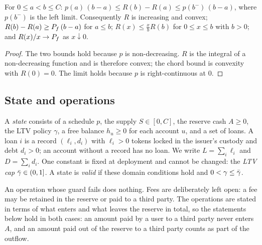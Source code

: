 \begin{lemma}\label{lem:R}
For $0\le a<b\le C$: $p(a)\,(b-a)\le R(b)-R(a)\le p(b^-)\,(b-a)$, where $p(b^-)$ is the left limit. Consequently $R$ is increasing and convex; $R(b)-R(a)\ge P_f\,(b-a)$ for $a\le b$; $R(x)\le \tfrac{x}{b}R(b)$ for $0\le x\le b$ with $b>0$; and $R(x)/x\to P_f$ as $x\downarrow0$.
\end{lemma}
\begin{proof}
The two bounds hold because $p$ is non-decreasing. $R$ is the integral of a non-decreasing function and is therefore convex; the chord bound is convexity with $R(0)=0$. The limit holds because $p$ is right-continuous at $0$.
\end{proof}

\subsection{State and operations}

A \emph{state} consists of a schedule $p$, the supply $S\in[0,C]$, the reserve cash $A\ge 0$, the LTV policy $\gamma$, a free balance $h_u\ge0$ for each account $u$, and a set of loans. A loan $i$ is a record $(\ell_i,d_i)$ with $\ell_i>0$ tokens locked in the issuer's custody and debt $d_i>0$; an account without a record has no loan. We write $L=\sum_i\ell_i$ and $D=\sum_i d_i$. One constant is fixed at deployment and cannot be changed: the \emph{LTV cap} $\bar\gamma\in(0,1]$. A state is \emph{valid} if these domain conditions hold and $0<\gamma\le\bar\gamma$.

An operation whose guard fails does nothing. Fees are deliberately left open: a fee may be retained in the reserve or paid to a third party. The operations are stated in terms of what enters and what leaves the reserve in total, so the statements below hold in both cases: an amount paid by a user to a third party never enters $A$, and an amount paid out of the reserve to a third party counts as part of the outflow.

